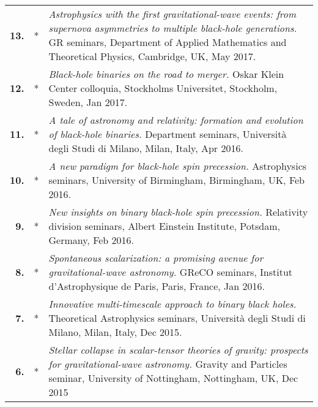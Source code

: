 \documentclass[a4paper]{moderncv}
\begin{document}
{\begin{longtable}{rp{0.4cm}p{15.8cm}}
%
\textbf{13.} & *& \textit{Astrophysics with the first gravitational-wave events: from supernova asymmetries to multiple black-hole generations.}
\newline{} 
GR seminars, Department of Applied Mathematics and Theoretical Physics, Cambridge, UK, May 2017.
\vspace{0.05cm}\\
%
\textbf{12.} & *& \textit{Black-hole binaries on the road to merger.}
\newline{} 
Oskar Klein Center colloquia, Stockholms Universitet, Stockholm, Sweden, Jan 2017.
\vspace{0.05cm}\\
%
\textbf{11.} & *& \textit{A tale of astronomy and relativity: formation and evolution of black-hole binaries.}
\newline{} 
Department seminars, Università degli Studi di Milano, Milan, Italy, Apr 2016.
\vspace{0.05cm}\\
%
\textbf{10.} & *& \textit{A new paradigm for black-hole spin precession.}
\newline{} 
Astrophysics seminars, University of Birmingham, Birmingham, UK, Feb 2016.
\vspace{0.05cm}\\
%
\textbf{9.} & *& \textit{New insights on binary black-hole spin precession.}
\newline{} 
Relativity division seminars, Albert Einstein Institute, Potsdam, Germany, Feb 2016.
\vspace{0.05cm}\\
%
\textbf{8.} & *& \textit{Spontaneous scalarization: a promising avenue for gravitational-wave astronomy.}
\newline{} 
GReCO seminars, Institut d'Astrophysique de Paris, Paris, France, Jan 2016.
\vspace{0.05cm}\\
%
\textbf{7.} & *& \textit{Innovative multi-timescale approach to binary black holes.}
\newline{} 
Theoretical Astrophysics seminars, Università degli Studi di Milano, Milan, Italy, Dec 2015.
\vspace{0.05cm}\\
%
\textbf{6.} & *& \textit{Stellar collapse in scalar-tensor theories of gravity: prospects for gravitational-wave astronomy.}
\newline{} 
Gravity and Particles seminar, University of Nottingham, Nottingham, UK, Dec 2015
\vspace{0.05cm}\\

\end{longtable}}
\end{document}
